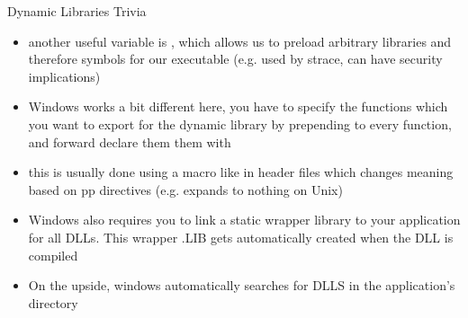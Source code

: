\documentclass[10pt,graphics,aspectratio=169,table]{beamer}
\begin{document}
\begin{frame}[fragile]{Dynamic Libraries Trivia}
\begin{itemize}
    \item another useful variable is , which allows us to
    preload arbitrary libraries and therefore symbols for our executable
    (e.g. used by strace, can have security implications)

    \item Windows works a bit different here, you have to specify the functions 
        which you want to export for the dynamic library by prepending 
         to every function,
        and forward declare them them with 
    \item this is usually done using a macro like  in header files
        which changes meaning based on pp directives 
        (e.g. expands to nothing on Unix)
    \item Windows also requires you to link a static wrapper library to your application
        for all DLLs. This wrapper .LIB gets automatically created when the DLL is compiled
    \item On the upside, windows automatically searches for DLLS in the application's directory 
\end{itemize}
\end{frame}
\end{document}
